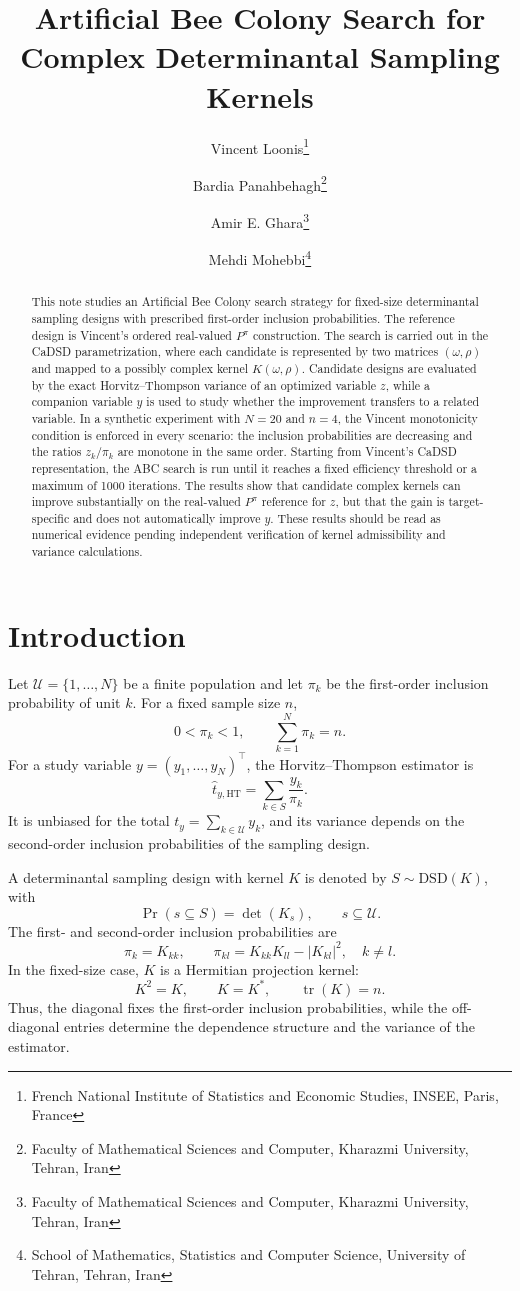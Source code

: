 \documentclass[12pt]{article}
\title{Artificial Bee Colony Search for Complex Determinantal Sampling Kernels}
\author{
Vincent Loonis\thanks{French National Institute of Statistics and Economic Studies, INSEE, Paris, France}
\and
Bardia Panahbehagh\thanks{Faculty of Mathematical Sciences and Computer, Kharazmi University, Tehran, Iran}
\and
Amir E. Ghara\thanks{Faculty of Mathematical Sciences and Computer, Kharazmi University, Tehran, Iran}
\and
Mehdi Mohebbi\thanks{School of Mathematics, Statistics and Computer Science, University of Tehran, Tehran, Iran}
}
\date{}
\newcommand{\U}{\mathcal{U}}
\newcommand{\Samp}{S}
\newcommand{\DSD}{\mathrm{DSD}}
\newcommand{\HT}{\mathrm{HT}}
\newcommand{\tr}{\operatorname{tr}}
\newcommand{\Ppi}{P^{\pi}}
\begin{document}
\maketitle

\begin{abstract}
This note studies an Artificial Bee Colony search strategy for fixed-size determinantal sampling designs with prescribed first-order inclusion probabilities. The reference design is Vincent's ordered real-valued \(\Ppi\) construction. The search is carried out in the CaDSD parametrization, where each candidate is represented by two matrices \((\omega,\rho)\) and mapped to a possibly complex kernel \(K(\omega,\rho)\). Candidate designs are evaluated by the exact Horvitz--Thompson variance of an optimized variable \(z\), while a companion variable \(y\) is used to study whether the improvement transfers to a related variable. In a synthetic experiment with \(N=20\) and \(n=4\), the Vincent monotonicity condition is enforced in every scenario: the inclusion probabilities are decreasing and the ratios \(z_k/\pi_k\) are monotone in the same order. Starting from Vincent's CaDSD representation, the ABC search is run until it reaches a fixed efficiency threshold or a maximum of 1000 iterations. The results show that candidate complex kernels can improve substantially on the real-valued \(\Ppi\) reference for \(z\), but that the gain is target-specific and does not automatically improve \(y\). These results should be read as numerical evidence pending independent verification of kernel admissibility and variance calculations.
\end{abstract}

\section{Introduction}

Let \(\U=\{1,\ldots,N\}\) be a finite population and let \(\pi_k\) be the first-order inclusion probability of unit \(k\). For a fixed sample size \(n\),
\[
    0<\pi_k<1,
    \qquad
    \sum_{k=1}^N \pi_k=n.
\]
For a study variable \(y=(y_1,\ldots,y_N)^\top\), the Horvitz--Thompson estimator is
\[
    \widehat t_{y,\HT}
    =
    \sum_{k\in\Samp}\frac{y_k}{\pi_k}.
\]
It is unbiased for the total \(t_y=\sum_{k\in\U}y_k\), and its variance depends on the second-order inclusion probabilities of the sampling design.

A determinantal sampling design with kernel \(K\) is denoted by \(\Samp\sim\DSD(K)\), with
\[
    \Pr(s\subseteq\Samp)=\det(K_s),
    \qquad s\subseteq\U.
\]
The first- and second-order inclusion probabilities are
\[
    \pi_k=K_{kk},
    \qquad
    \pi_{kl}=K_{kk}K_{ll}-|K_{kl}|^2,
    \quad k\neq l.
\]
In the fixed-size case, \(K\) is a Hermitian projection kernel:
\[
    K^2=K,
    \qquad
    K=K^*,
    \qquad
    \tr(K)=n.
\]
Thus, the diagonal fixes the first-order inclusion probabilities, while the off-diagonal entries determine the dependence structure and the variance of the estimator.
\end{document}
